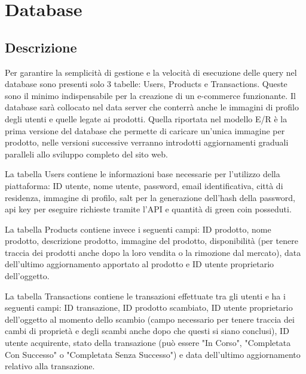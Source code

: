 \section{Database}
\subsection{Descrizione}
Per garantire la semplicità di gestione e la velocità di esecuzione delle query nel database sono presenti solo 3 tabelle: Users, Products e Transactions. Queste sono il minimo indispensabile per la creazione di un e-commerce funzionante. Il database sarà collocato nel data server che conterrà anche le immagini di profilo degli utenti e quelle legate ai prodotti. Quella riportata nel modello E/R è la prima versione del database che permette di caricare un'unica immagine per prodotto, nelle versioni successive verranno introdotti aggiornamenti graduali paralleli allo sviluppo completo del sito web. 
\medskip

La tabella Users contiene le informazioni base necessarie per l'utilizzo della piattaforma: ID utente, nome utente, password, email identificativa, città di residenza, immagine di profilo, salt per la generazione dell'hash della password, api key per eseguire richieste tramite l'API e quantità di green coin posseduti. 
\medskip

La tabella Products contiene invece i seguenti campi: ID prodotto, nome prodotto, descrizione prodotto, immagine del prodotto, disponibilità (per tenere traccia dei prodotti anche dopo la loro vendita o la rimozione dal mercato), data dell'ultimo aggiornamento apportato al prodotto e ID utente proprietario dell'oggetto. 
\medskip

La tabella Transactions contiene le transazioni effettuate tra gli utenti e ha i seguenti campi: ID transazione, ID prodotto scambiato, ID utente proprietario dell'oggetto al momento dello scambio (campo necessario per tenere traccia dei cambi di proprietà e degli scambi anche dopo che questi si siano conclusi), ID utente acquirente, stato della transazione (può essere "In Corso", "Completata Con Successo" o "Completata Senza Successo") e data dell'ultimo aggiornamento relativo alla transazione.  
